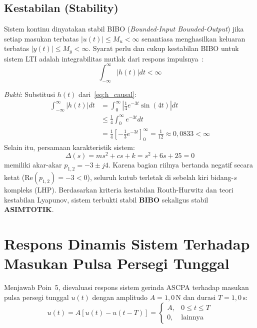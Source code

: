 \documentclass[journal]{IEEEtran}
\begin{document}
\subsection{Kestabilan (Stability)}
Sistem kontinu dinyatakan stabil BIBO (\textit{Bounded-Input Bounded-Output}) jika setiap masukan terbatas $|u(t)| \le M_u < \infty$ senantiasa menghasilkan keluaran terbatas $|y(t)| \le M_y < \infty$. Syarat perlu dan cukup kestabilan BIBO untuk sistem LTI adalah integrabilitas mutlak dari respons impulsnya~\cite{lathi2018linear}:
\begin{equation}
    \int_{-\infty}^\infty |h(t)| dt < \infty
    \label{eq:bibo_cond}
\end{equation}

\textit{Bukti}: Substitusi $h(t)$ dari~\eqref{eq:h_causal}:
\begin{align}
    \int_{-\infty}^\infty |h(t)| dt &= \int_0^\infty \left| \frac{1}{4} e^{-3t} \sin(4t) \right| dt \nonumber \\
    &\le \frac{1}{4} \int_0^\infty e^{-3t} dt \nonumber \\
    &= \frac{1}{4} \left[ -\frac{1}{3} e^{-3t} \right]_0^\infty = \frac{1}{12} \approx 0{,}0833 < \infty
    \label{eq:integral_h_bound}
\end{align}
Selain itu, persamaan karakteristik sistem:
\begin{equation}
    \Delta(s) = m s^2 + c s + k = s^2 + 6s + 25 = 0
\end{equation}
memiliki akar-akar $p_{1,2} = -3 \pm j4$. Karena bagian riilnya bertanda negatif secara ketat ($\text{Re}(p_{1,2}) = -3 < 0$), seluruh kutub terletak di sebelah kiri bidang-$s$ kompleks (LHP). Berdasarkan kriteria kestabilan Routh-Hurwitz dan teori kestabilan Lyapunov, sistem terbukti stabil \textbf{BIBO} sekaligus stabil \textbf{ASIMTOTIK}.

\section{Respons Dinamis Sistem Terhadap Masukan Pulsa Persegi Tunggal}
Menjawab Poin~5, dievaluasi respons sistem gerinda ASCPA terhadap masukan pulsa persegi tunggal $u(t)$ dengan amplitudo $A = 1{,}0\,\text{N}$ dan durasi $T = 1{,}0\,\text{s}$:
\begin{equation}
    u(t) = A [u(t) - u(t - T)] = \begin{cases} A, & 0 \le t \le T \\ 0, & \text{lainnya} \end{cases}
    \label{eq:pulse_def}
\end{equation}
\end{document}
